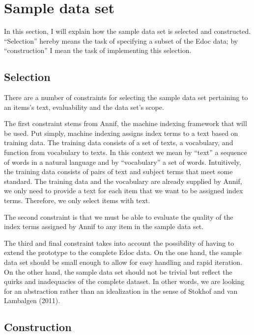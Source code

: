 \hypertarget{sample-data-set}{%
\section{Sample data set}\label{sample-data-set}}

In this section, I will explain how the sample data set is selected and
constructed. ``Selection'' hereby means the task of specifying a subset
of the Edoc data; by ``construction'' I mean the task of implementing
this selection.

\hypertarget{selection}{%
\subsection{Selection}\label{selection}}

There are a number of constraints for selecting the sample data set
pertaining to an items's text, evaluability and the data set's scope.

The first constraint stems from Annif, the machine indexing framework
that will be used. Put simply, machine indexing assigns index terms to a
text based on training data. The training data consists of a set of
texts, a vocabulary, and function from vocabulary to texts. In this
context we mean by ``text'' a sequence of words in a natural language
and by ``vocabulary'' a set of words. Intuitively, the training data
consists of pairs of text and subject terms that meet some standard. The
training data and the vocabulary are already supplied by Annif, we only
need to provide a text for each item that we want to be assigned index
terms. Therefore, we only select items with text.

The second constraint is that we must be able to evaluate the quality of
the index terms assigned by Annif to any item in the sample data set.

The third and final constraint takes into account the possibility of
having to extend the prototype to the complete Edoc data. On the one
hand, the sample data set should be small enough to allow for easy
handling and rapid iteration. On the other hand, the sample data set
should not be trivial but reflect the quirks and inadequacies of the
complete dataset. In other words, we are looking for an abstraction
rather than an idealization in the sense of Stokhof and van Lambalgen
(2011).

\hypertarget{construction}{%
\subsection{Construction}\label{construction}}

